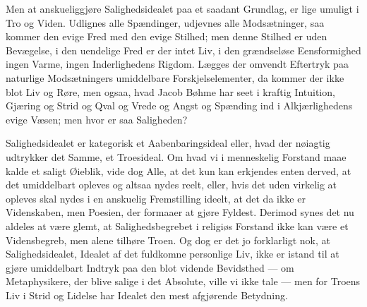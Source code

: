 \documentclass[12pt]{book}
\begin{document}
Men at anskueliggjøre Salighedsidealet paa et saadant Grundlag, er
lige umuligt i Tro og Viden. Udlignes alle Spændinger, udjevnes alle
Modsætninger, saa kommer den evige Fred med den evige Stilhed; men
denne Stilhed er uden Bevægelse, i den uendelige Fred er der intet
Liv, i den grændseløse Eensformighed ingen Varme, ingen
Inderlighedens Rigdom. Lægges der omvendt
Eftertryk paa naturlige Modsætningers umiddelbare Forskjelselementer,
da kommer der ikke blot Liv og Røre, men ogsaa, hvad Jacob Bøhme har
seet i kraftig Intuition, Gjæring og Strid og Qval og Vrede og Angst
og Spænding ind i Alkjærlighedens evige Væsen; men hvor er saa
Saligheden?

Salighedsidealet er kategorisk et Aabenbaringsideal eller, hvad der
nøiagtig udtrykker det Samme, et Troesideal. Om hvad vi i menneskelig
Forstand maae kalde et saligt Øieblik, vide dog Alle, at det kun kan
erkjendes enten derved, at det umiddelbart opleves og altsaa nydes
reelt, eller, hvis det uden virkelig at opleves skal nydes i en
anskuelig Fremstilling ideelt, at det da ikke er Videnskaben, men
Poesien, der formaaer at gjøre Fyldest. Derimod synes det nu aldeles
at være glemt, at Salighedsbegrebet i religiøs Forstand ikke kan
være et Vidensbegreb, men alene tilhøre Troen. Og dog er det jo
forklarligt nok, at Salighedsidealet, Idealet af det fuldkomne
personlige Liv, ikke er istand til at gjøre umiddelbart Indtryk paa
den blot vidende Bevidsthed --- om Metaphysikere, der blive salige i
det Absolute, ville vi ikke tale --- men for Troens Liv i Strid og
Lidelse har Idealet den mest afgjørende Betydning.
\end{document}
